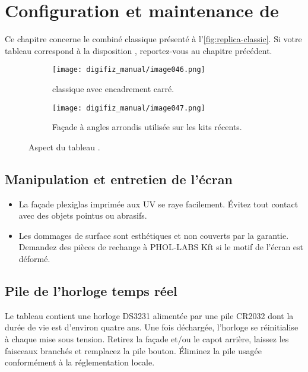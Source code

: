 \chapter{Configuration et maintenance de \ReplicaGenOne{}}\label{ch:replica-setup}

Ce chapitre concerne le combiné \ReplicaGenOne{} classique présenté à l'\autoref{fig:replica-classic}. Si votre tableau correspond à la disposition \ReplicaNextLong{}, reportez-vous au chapitre précédent.

\begin{figure}[htbp]
    \centering
    \begin{subfigure}{0.46\textwidth}
        \texttt{[image: digifiz\_manual/image046.png]}
        \caption{\ReplicaGenOne{} classique avec encadrement carré.}
    \end{subfigure}\hfill
    \begin{subfigure}{0.46\textwidth}
        \texttt{[image: digifiz\_manual/image047.png]}
        \caption{Façade à angles arrondis utilisée sur les kits récents.}
    \end{subfigure}
    \caption{Aspect du tableau \ReplicaGenOne{}.}
    \label{fig:replica-classic}
\end{figure}

\section{Manipulation et entretien de l'écran}
\begin{itemize}
    \item La façade plexiglas imprimée aux UV se raye facilement. Évitez tout contact avec des objets pointus ou abrasifs.
    \item Les dommages de surface sont esthétiques et non couverts par la garantie. Demandez des pièces de rechange à PHOL-LABS Kft si le motif de l'écran est déformé.
\end{itemize}

\section{Pile de l'horloge temps réel}
Le tableau contient une horloge DS3231 alimentée par une pile CR2032 dont la durée de vie est d'environ quatre ans. Une fois déchargée, l'horloge se réinitialise à chaque mise sous tension. Retirez la façade et/ou le capot arrière, laissez les faisceaux branchés et remplacez la pile bouton. Éliminez la pile usagée conformément à la réglementation locale.

